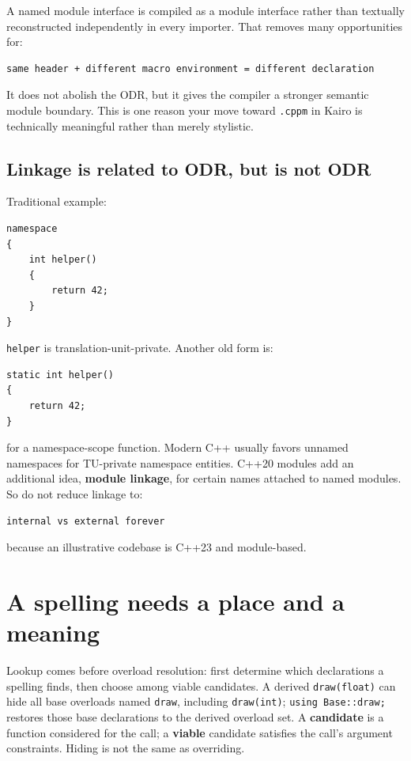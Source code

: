 A named module interface is compiled as a module interface rather than textually reconstructed independently in every importer. That removes many opportunities for:

\begin{verbatim}
same header + different macro environment = different declaration
\end{verbatim}

It does not abolish the ODR, but it gives the compiler a stronger semantic module boundary. This is one reason your move toward \texttt{.cppm} in Kairo is technically meaningful rather than merely stylistic.

\subsection{Linkage is related to ODR, but is not ODR}\label{05-engine-i-ch002-linkage-is-related-to-odr-but-is-not-odr}

Traditional example:

\begin{verbatim}
namespace
{
    int helper()
    {
        return 42;
    }
}
\end{verbatim}

\texttt{helper} is translation-unit-private. Another old form is:

\begin{verbatim}
static int helper()
{
    return 42;
}
\end{verbatim}

for a namespace-scope function. Modern C++ usually favors unnamed namespaces for TU-private namespace entities. C++20 modules add an additional idea, \textbf{module linkage}, for certain names attached to named modules. So do not reduce linkage to:

\begin{verbatim}
internal vs external forever
\end{verbatim}

because an illustrative codebase is C++23 and module-based.

\section{A spelling needs a place and a meaning}\label{05-engine-i-ch002-a-spelling-needs-a-place-and-a-meaning}

Lookup comes before overload resolution: first determine which declarations a spelling finds, then choose among viable candidates. A derived \texttt{draw(float)} can hide all base overloads named \texttt{draw}, including \texttt{draw(int)}; \texttt{using\ Base::draw;} restores those base declarations to the derived overload set. A \textbf{candidate} is a function considered for the call; a \textbf{viable} candidate satisfies the call's argument constraints. Hiding is not the same as overriding.

